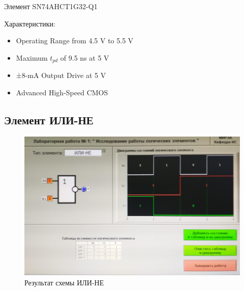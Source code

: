 Элемент SN74AHCT1G32-Q1

Характеристики:
\begin{itemize}
	\item Operating Range from 4.5 V to 5.5 V
	\item Maximum $t_{pd}$ of 9.5 ns at 5 V
	\item ±8-mA Output Drive at 5 V
	\item Advanced High-Speed CMOS 
\end{itemize}

\subsection{Элемент ИЛИ-НЕ}

\begin{figure}[H]
	\centering
	\includegraphics[width=0.85\linewidth]{imgs/1/or-not}
	\caption{Результат схемы ИЛИ-НЕ}
	\label{fig:1_or-not}
\end{figure}

